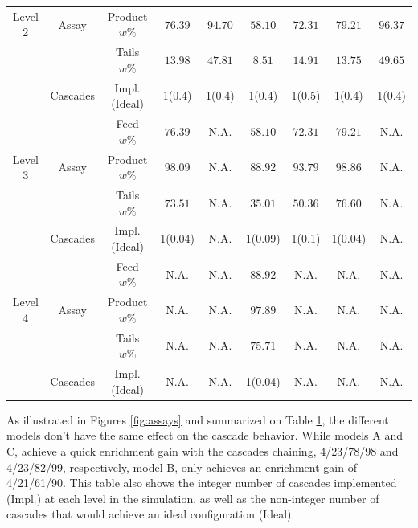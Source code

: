 \begin{table}[h!]
{\begin{tabular*}{\textwidth}{c @{\extracolsep{\fill}} cccccccc}
Level 2 & Assay      & Product $w\%$  & $76.39$  & $94.70$  & $58.10$  & $72.31$  & $79.21$  & $96.37$ \\
        &            & Tails $w\%$    & $13.98$  & $47.81$  & $8.51$   & $14.91$  & $13.75$  & $49.65$ \\
        & Cascades   & Impl. (Ideal)  & 1(0.4)   & 1(0.4)   & 1(0.4)   & 1(0.5)   & 1(0.4)   & 1(0.4)   \\
\midrule                                                                                                 
        &            & Feed $w\%$     & $76.39$  & N.A.     & $58.10$  & $72.31$  & $79.21$  & N.A.      \\
Level 3 & Assay      & Product $w\%$  & $98.09$  & N.A.     & $88.92$  & $93.79$  & $98.86$  & N.A.      \\
        &            & Tails $w\%$    & $73.51$  & N.A.     & $35.01$  & $50.36$  & $76.60$  & N.A.      \\
        & Cascades   & Impl. (Ideal)  & 1(0.04)  & N.A.     & 1(0.09)  & 1(0.1)   & 1(0.04)  & N.A.      \\
\midrule                                                                                                 
        &            & Feed $w\%$     & N.A.     & N.A.     & $88.92$  & N.A.     & N.A.     & N.A.      \\
Level 4 & Assay      & Product $w\%$  & N.A.     & N.A.     & $97.89$  & N.A.     & N.A.     & N.A.      \\
        &            & Tails $w\%$    & N.A.     & N.A.     & $75.71$  & N.A.     & N.A.     & N.A.      \\
        & Cascades   & Impl. (Ideal)  & N.A.     & N.A.     & 1(0.04)  & N.A.     & N.A.     & N.A.      \\
\bottomrule
\end{tabular*}
}
\label{tab:level}
\end{table}

As illustrated in Figures \ref{fig:assays} and summarized on Table
\ref{tab:level}, the different models don't have the same effect on the
cascade behavior. While models A and C, achieve a quick enrichment gain with
the cascades chaining, 4/23/78/98 and 4/23/82/99, respectively, model B, only
achieves an enrichment gain of 4/21/61/90.  This table also shows the integer
number of cascades implemented (Impl.) at each level in the simulation, as well as the
non-integer number of cascades that would achieve an ideal configuration (Ideal).


